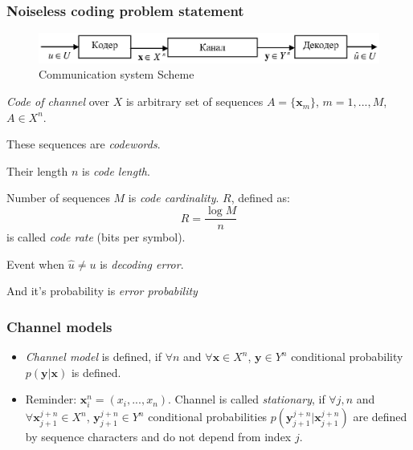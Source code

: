 \documentclass[14pt]{beamer}
\renewcommand{\vec}[1]{\ensuremath{\boldsymbol{#1}}}
\begin{document}
\begin{frame}
\frametitle{Noiseless coding problem statement}
\begin{itemize}
\small{

    \item
        \begin{figure}[ht]
        \begin{minipage}{1.0\linewidth}
        \includegraphics[width=1.0\textwidth]{fig5_1.eps}
        \caption{Communication system Scheme}
        \label{fig5_1}
        \end{minipage}
        \end{figure}    

    \pause 
    \item
        \textit{Code of channel} over $X$ is arbitrary set of sequences $A = \{{\vec x}_m \}$, $m = 1,...,M$, $A \in X^n$. 
    \item    
        These sequences are \textit{codewords}.
    \item    
        Their length $n$ is \textit{code length}. 
    \item   
        Number of sequences $M$ is \textit{code cardinality}.
        $R$, defined as:
        \begin{equation}
            R = \frac{\log M}{n}
        \end{equation}
        is called \textit{code rate} (bits per symbol).
    \item 
        Event when $\hat {u} \ne u$ is \textit{decoding error}.
    \item 
        And it's probability is \textit{error probability}
}
\end{itemize}
\end{frame}



\begin{frame}
\frametitle{Channel models}
\begin{itemize}
\item
    \textit{Channel model} is defined, if $\forall  n$ and $\forall  {\vec x} \in X^n$, ${\vec y} \in Y^n$ conditional probability $p({\vec y}\vert {\vec x})$ is defined.

\pause \item
    Reminder: ${\vec x}_i^n = (x_i ,...,x_n )$. 
    Channel is called \textit{stationary}, if $\forall  j, n $ and $ \forall {\vec x}_{j + 1}^{j + n} \in X^n$, ${\vec y}_{j + 1}^{j + n} \in Y^n$ conditional probabilities $p({\vec y}_{j + 1}^{j + n} \vert {\vec x}_{j + 1}^{j + n} )$ are defined by sequence characters and do not depend from index $j$.

\end{itemize}
\end{frame}
\end{document}
